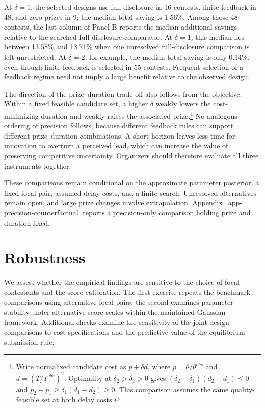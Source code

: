 \documentclass[mnsc]{informs3}
\begin{document}
At $\delta=1$, the selected designs use full disclosure in 16 contests, finite feedback in 48, and zero prizes in 9; the median total saving is 1.56\%. Among those 48 contests, the last column of Panel B reports the median additional savings relative to the searched full-disclosure comparator. At $\delta=1$, this median lies between 13.58\% and 13.71\% when one unresolved full-disclosure comparison is left unrestricted. At $\delta=2$, for example, the median total saving is only 0.14\%, even though finite feedback is selected in 55 contests. Frequent selection of a feedback regime need not imply a large benefit relative to the observed design.

The direction of the prize--duration trade-off also follows from the objective. Within a fixed feasible candidate set, a higher $\delta$ weakly lowers the cost-minimizing duration and weakly raises the associated prize.\footnote{Write normalized candidate cost as $p+\delta d$, where $p=\theta/\theta^{obs}$ and $d=(T/T^{obs})^2$. Optimality at $\delta_2>\delta_1>0$ gives $(\delta_2-\delta_1)(d_2-d_1)\leq0$ and $p_2-p_1\geq\delta_1(d_1-d_2)\geq0$. This comparison assumes the same quality-feasible set at both delay costs.} No analogous ordering of precision follows, because different feedback rules can support different prize--duration combinations. A short horizon leaves less time for innovation to overturn a perceived lead, which can increase the value of preserving competitive uncertainty. Organizers should therefore evaluate all three instruments together.

These comparisons remain conditional on the approximate parameter posterior, a fixed focal pair, assumed delay costs, and a finite search. Unresolved alternatives remain open, and large prize changes involve extrapolation. Appendix~\ref{app-precision-counterfactual} reports a precision-only comparison holding prize and duration fixed.


\section{Robustness}

{We assess whether the empirical findings are sensitive to the choice of focal contestants and the score calibration. The first exercise repeats the benchmark comparisons using alternative focal pairs; the second examines parameter stability under alternative score scales within the maintained Gaussian framework. Additional checks examine the sensitivity of the joint design comparisons to cost specifications and the predictive value of the equilibrium submission rule.}
\end{document}
